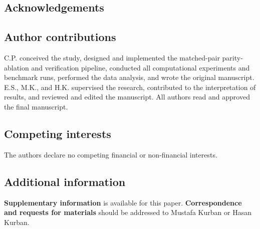\subsection*{Acknowledgements}


\subsection*{Author contributions}

C.P. conceived the study, designed and implemented the matched-pair parity-ablation and verification pipeline, conducted all computational experiments and benchmark runs, performed the data analysis, and wrote the original manuscript. E.S., M.K., and H.K. supervised the research, contributed to the interpretation of results, and reviewed and edited the manuscript. All authors read and approved the final manuscript.

\subsection*{Competing interests}

The authors declare no competing financial or non-financial interests.

\subsection*{Additional information}

\textbf{Supplementary information} is available for this paper. \textbf{Correspondence and requests for materials} should be addressed to Mustafa Kurban or Hasan Kurban.
